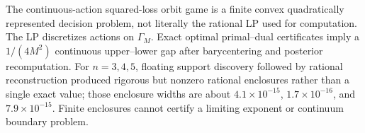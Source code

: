 The continuous-action squared-loss orbit game is a finite convex quadratically represented decision problem, not literally the rational LP used for computation.  The LP discretizes actions on \(\Gamma_M\).  Exact optimal primal--dual certificates imply a \(1/(4M^2)\) continuous upper--lower gap after barycentering and posterior recomputation.  For \(n=3,4,5\), floating support discovery followed by rational reconstruction produced rigorous but nonzero rational enclosures rather than a single exact value; those enclosure widths are about \(4.1\times10^{-15}\), \(1.7\times10^{-16}\), and \(7.9\times10^{-15}\).  Finite enclosures cannot certify a limiting exponent or continuum boundary problem.